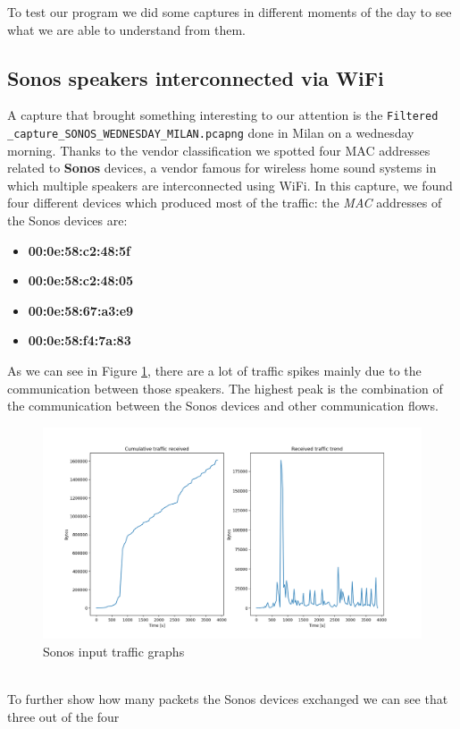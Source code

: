 To test our program we did some captures in different moments of the day to see what we are able to 
understand from them.


\subsection{Sonos speakers interconnected via WiFi}
 A capture that brought something interesting to our attention is the \texttt{Filtered
\_capture\_SONOS\_WEDNESDAY\_MILAN.pcapng} done in Milan on a wednesday morning. Thanks to the vendor 
classification we spotted four MAC addresses related to \textbf{Sonos} devices, a vendor famous for
wireless home sound systems in which multiple speakers are interconnected using WiFi. In this capture,
we found four different devices which produced most of the traffic: the \textit{MAC} addresses of the Sonos 
devices are:
\begin{itemize}
    \item \textbf{00:0e:58:c2:48:5f}
    \item \textbf{00:0e:58:c2:48:05}
    \item \textbf{00:0e:58:67:a3:e9}
    \item \textbf{00:0e:58:f4:7a:83}
\end{itemize}
As we can see in Figure \ref{fig:Sonos_traffic}, there are a lot of traffic spikes mainly due to the
communication between those speakers. The highest peak is the combination of the communication between
the Sonos devices and other communication flows.
\begin{figure}[h]
    \includegraphics[width=\textwidth]{Graphs/SONOS_cum_in_traffic.png}
    \caption{Sonos input traffic graphs}
    \label{fig:Sonos_traffic}
\end{figure}
\\
To further show how many packets the Sonos devices exchanged we can see that three out of the four
